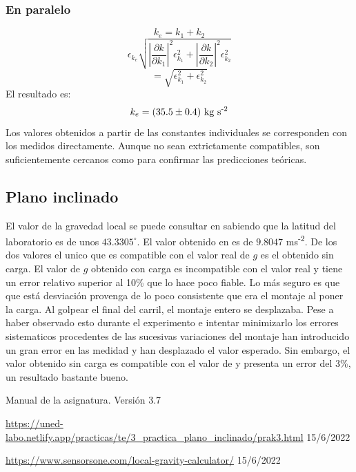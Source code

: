 \documentclass{article}
\begin{document}
\begin{multicols}{2}
\subsubsection*{En paralelo}
$$
k_e = k_1 + k_2
$$
$$
\epsilon_{k_e} \sqrt{
    \left|
        \frac{\partial k}{\partial k_1}
    \right|^2 \epsilon_{k_1}^2
    +
    \left|
        \frac{\partial k}{\partial k_2}
    \right|^2 \epsilon_{k_2}^2
}
$$
$$
=
\sqrt{
    \epsilon_{k_1}^2
    +
    \epsilon_{k_2}^2
}
$$
El resultado es:
$$
k_e = (35.5\pm 0.4) \text{ kg s\textsuperscript{-2}}
$$
Los valores obtenidos a partir de las constantes individuales se corresponden con los medidos directamente. Aunque no sean extrictamente compatibles, son suficientemente cercanos como para confirmar las predicciones teóricas.
\subsection*{Plano inclinado}
El valor de la gravedad local se puede consultar en \cite{gravedad} sabiendo que la latitud del laboratorio es de unos $43.3305^\circ$. El valor obtenido en \cite{gravedad} es de $9.8047$ ms\textsuperscript{-2}. De los dos valores el unico que es compatible con el valor real de $g$ es el obtenido sin carga. El valor de $g$ obtenido con carga es incompatible con el valor real y tiene un error relativo superior al 10\% que lo hace poco fiable. Lo más seguro es que que está desviación provenga de lo poco consistente que era el montaje al poner la carga. Al golpear el final del carril, el montaje entero se desplazaba. Pese a haber observado esto durante el experimento e intentar minimizarlo los errores sistematicos procedentes de las sucesivas variaciones del montaje han introducido un gran error en las medidad y han desplazado el valor esperado. Sin embargo, el valor obtenido sin carga es compatible con el valor de \cite{gravedad} y presenta un error del 3\%, un resultado bastante bueno.

\begin{thebibliography}{1}

  Manual de la asignatura. Versión 3.7

  \url{https://uned-labo.netlify.app/practicas/te/3_practica_plano_inclinado/prak3.html} 15/6/2022

  \url{https://www.sensorsone.com/local-gravity-calculator/} 15/6/2022

\end{thebibliography}
\end{multicols}
\end{document}
